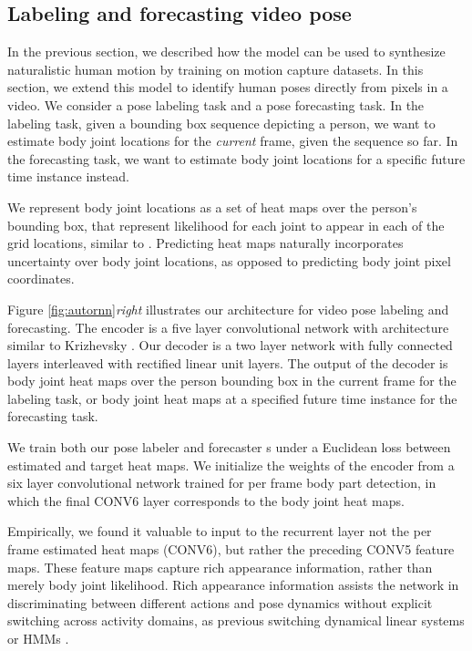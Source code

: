 \documentclass[10pt,twocolumn,letterpaper]{article}
\begin{document}
\subsection{Labeling and forecasting video pose}
In the previous section, we described how the  model can be used to synthesize naturalistic human motion by training on  motion capture datasets. 
In this section, we extend this model to identify human poses directly from pixels in a video. We consider a pose labeling task and a pose forecasting task. In the labeling task, given a bounding box sequence depicting a person, we want to estimate body joint locations for the \textit{current} frame, given the sequence so far.
In the forecasting task, we want to estimate body joint locations for a specific future time instance instead.   








We represent  body joint locations as a set of   heat maps over the person's bounding box, that represent likelihood for each joint to appear in each of the  grid locations, similar to \cite{vpsKpsTulsianiM14}.  Predicting heat maps naturally incorporates uncertainty over  body joint locations, as opposed to predicting body joint pixel coordinates. 
 






Figure \ref{fig:autornn}\textit{right} illustrates our  architecture for video pose labeling and forecasting.  The encoder is a five layer convolutional network with architecture similar to Krizhevsky  \cite{NIPS2012_0534}. Our decoder is a two layer network with fully connected layers interleaved with  rectified linear unit layers.  
The output of the decoder  is    body joint heat maps over the person bounding box in the current frame for the labeling task, or body joint heat maps at a specified future time instance for the forecasting  task. 





We train both our pose labeler and forecaster s under a Euclidean loss between estimated and target heat maps. 
We initialize the weights of the encoder from a   six layer convolutional network trained for per frame body part detection, in which the final CONV6 layer corresponds to the body joint heat maps.  

Empirically, we found it valuable to input to the recurrent layer not the per frame estimated heat maps (CONV6), but rather the preceding CONV5  feature maps.   These feature maps capture rich appearance information, rather than merely  body joint likelihood.  
Rich appearance information  assists the network in discriminating between different actions and pose dynamics without  explicit switching across activity domains, as previous switching dynamical linear systems  or HMMs \cite{prm-lslmh-00}.
\end{document}
